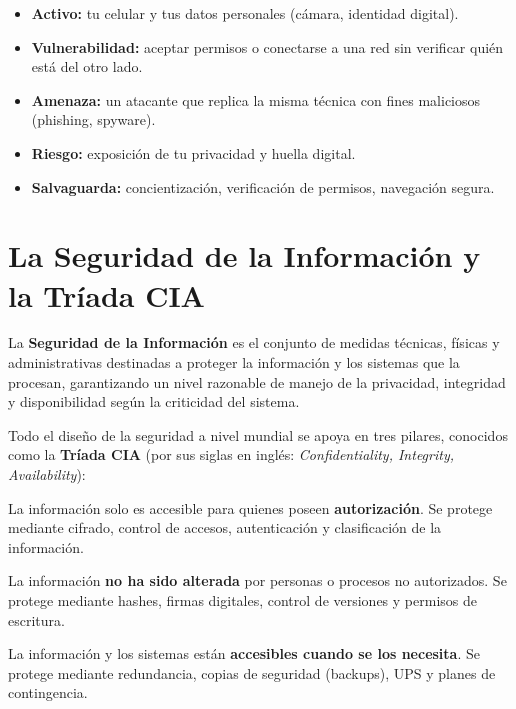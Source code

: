 \documentclass[11pt,a4paper]{article}
\begin{document}
\begin{ejemplo}
\begin{itemize}[leftmargin=*]
  \item \textbf{Activo:} tu celular y tus datos personales (cámara, identidad digital).
  \item \textbf{Vulnerabilidad:} aceptar permisos o conectarse a una red sin verificar quién está del otro lado.
  \item \textbf{Amenaza:} un atacante que replica la misma técnica con fines maliciosos (phishing, spyware).
  \item \textbf{Riesgo:} exposición de tu privacidad y huella digital.
  \item \textbf{Salvaguarda:} concientización, verificación de permisos, navegación segura.
\end{itemize}
\end{ejemplo}

\section{La Seguridad de la Información y la Tríada CIA}
La \textbf{Seguridad de la Información} es el conjunto de medidas técnicas, físicas y administrativas destinadas a proteger la información y los sistemas que la procesan, garantizando un nivel razonable de manejo de la privacidad, integridad y disponibilidad según la criticidad del sistema.

Todo el diseño de la seguridad a nivel mundial se apoya en tres pilares, conocidos como la \textbf{Tríada CIA} (por sus siglas en inglés: \textit{Confidentiality, Integrity, Availability}):

\begin{definicion}[Confidencialidad (C)]
La información solo es accesible para quienes poseen \textbf{autorización}. Se protege mediante cifrado, control de accesos, autenticación y clasificación de la información.
\end{definicion}

\begin{definicion}[Integridad (I)]
La información \textbf{no ha sido alterada} por personas o procesos no autorizados. Se protege mediante hashes, firmas digitales, control de versiones y permisos de escritura.
\end{definicion}

\begin{definicion}[Disponibilidad (A)]
La información y los sistemas están \textbf{accesibles cuando se los necesita}. Se protege mediante redundancia, copias de seguridad (backups), UPS y planes de contingencia.
\end{definicion}
\end{document}
